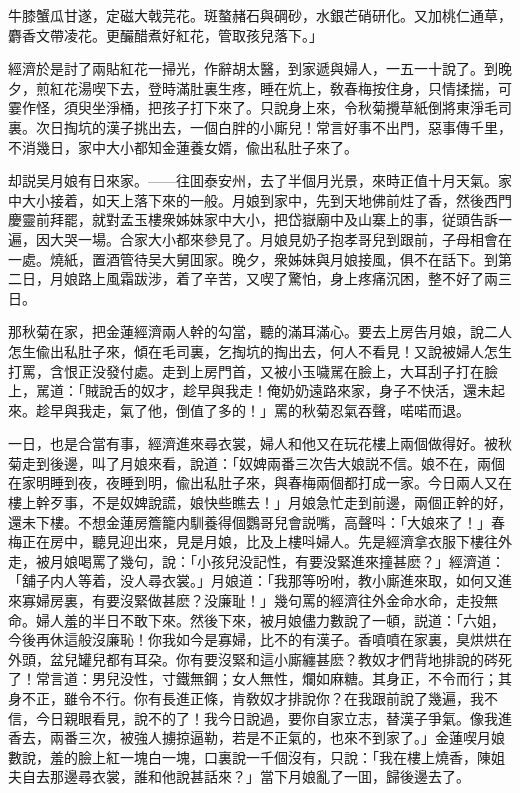\begin{myquote}
牛膝蟹瓜甘遂，定磁大戟芫花。斑螯赭石與碙砂，水銀芒硝研化。又加桃仁通草，麝香文帶凌花。更釅醋煮好紅花，管取孩兒落下。」
\end{myquote}

經濟於是討了兩貼紅花一掃光，作辭胡太醫，到家遞與婦人，一五一十說了。到晚夕，煎紅花湯喫下去，登時滿肚裏生疼，睡在炕上，敎春梅按住身，只情揉揣，可霎作怪，須臾坐淨桶，把孩子打下來了。只說身上來，令秋菊攪草紙倒將東淨毛司裏。次日掏坑的漢子挑出去，一個白胖的小廝兒！常言好事不出門，惡事傳千里，不消幾日，家中大小都知金蓮養女婿，偸出私肚子來了。

却説吴月娘有日來家。——往囬泰安州，去了半個月光景，來時正值十月天氣。家中大小接着，如天上落下來的一般。月娘到家中，先到天地佛前炷了香，然後西門慶靈前拜罷，就對孟玉樓衆姊妹家中大小，把岱嶽廟中及山寨上的事，従頭告訴一遍，因大哭一場。合家大小都來參見了。月娘見奶子抱孝哥兒到跟前，子母相會在一處。燒紙，置酒管待吴大舅囬家。晚夕，衆姊妹與月娘接風，俱不在話下。到第二日，月娘路上風霜跋涉，着了辛苦，又喫了驚怕，身上疼痛沉困，整不好了兩三日。

那秋菊在家，把金蓮經濟兩人幹的勾當，聽的滿耳滿心。要去上房告月娘，說二人怎生偸出私肚子來，傾在毛司裏，乞掏坑的掏出去，何人不看見！又說被婦人怎生打罵，含恨正没發付處。走到上房門首，又被小玉噦駡在臉上，大耳刮子打在臉上，駡道：「賊說舌的奴才，趁早與我走！俺奶奶遠路來家，身子不快活，還未起來。趁早與我走，氣了他，倒值了多的！」罵的秋菊忍氣吞聲，喏喏而退。

一日，也是合當有事，經濟進來尋衣裳，婦人和他又在玩花樓上兩個做得好。被秋菊走到後邊，叫了月娘來看，說道：「奴婢兩番三次告大娘説不信。娘不在，兩個在家明睡到夜，夜睡到明，偸出私肚子來，與春梅兩個都打成一家。今日兩人又在樓上幹歹事，不是奴婢說謊，娘快些瞧去！」月娘急忙走到前邊，兩個正幹的好，還未下樓。不想金蓮房簷籠内馴養得個鸚哥兒會説嘴，高聲呌：「大娘來了！」春梅正在房中，聽見迎出來，見是月娘，比及上樓呌婦人。先是經濟拿衣服下樓往外走，被月娘喝罵了幾句，說：「小孩兒没記性，有要没緊進來撞甚麽？」經濟道：「舖子内人等着，没人尋衣裳。」月娘道：「我那等吩咐，教小廝進來取，如何又進來寡婦房裏，有要沒緊做甚麽？没廉耻！」幾句罵的經濟往外金命水命，走投無命。婦人羞的半日不敢下來。然後下來，被月娘儘力數說了一頓，説道：「六姐，今後再休這般沒廉恥！你我如今是寡婦，比不的有漢子。香噴噴在家裏，臭烘烘在外頭，盆兒罐兒都有耳朶。你有要沒緊和這小廝纏甚麽？教奴才們背地排說的硶死了！常言道：男兒没性，寸鐵無鋼；女人無性，爛如麻糖。其身正，不令而行；其身不正，雖令不行。你有長進正條，肯敎奴才排說你？在我跟前說了幾遍，我不信，今日親眼看見，說不的了！我今日說過，要你自家立志，替漢子爭氣。像我進香去，兩番三次，被強人擄掠逼勒，若是不正氣的，也來不到家了。」金蓮喫月娘數說，羞的臉上紅一塊白一塊，口裏說一千個沒有，只說：「我在樓上燒香，陳姐夫自去那邊尋衣裳，誰和他說甚話來？」當下月娘亂了一囬，歸後邊去了。

